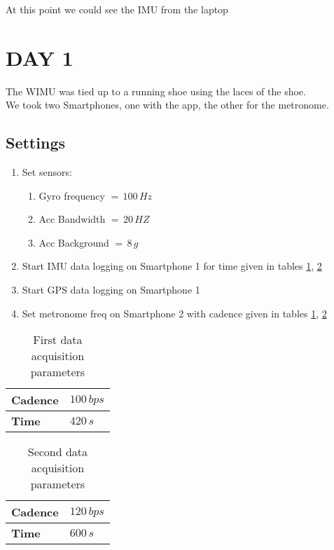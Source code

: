 \documentclass[a4paper,twoside,10pt]{report}
\begin{document}
At this point we could see the IMU from the laptop 
 



\section{DAY 1}
The WIMU was tied up to a running shoe using the laces of the shoe. \\
We took two Smartphones, one with the app, the other for the metronome. \\

\subsection{Settings} 
\begin{enumerate}
	\item Set sensors: 
		\begin{enumerate}
			\item Gyro frequency  $=\, 100\,Hz$
			\item Acc Bandwidth  $=\, 20\, HZ$
			\item Acc Background $=\, 8\,g$
		\end{enumerate}
	\item Start IMU data logging on Smartphone 1 for time given in tables \ref{tab:FirstDataAcquisitionParameters}, \ref{tab:SecondDataAcquisitionParameters}
	\item Start GPS data logging on Smartphone 1
	\item Set metronome freq on Smartphone 2 with cadence given in tables \ref{tab:FirstDataAcquisitionParameters}, \ref{tab:SecondDataAcquisitionParameters}
\end{enumerate}

\begin{table}[h]
	\centering
		\begin{tabular}{|l|l|}
		  \hline
			\textbf{Cadence} & $100\,bps$\\
			\hline
			\textbf{Time} & $420\,s$\\
			\hline
		\end{tabular}
	\caption{First data acquisition parameters}
	\label{tab:FirstDataAcquisitionParameters}
\end{table}

\begin{table}[h]
	\centering
		\begin{tabular}{|l|l|}
		  \hline
			\textbf{Cadence} & $120\,bps$\\
			\hline
			\textbf{Time} & $600\,s$\\
			\hline
		\end{tabular}
	\caption{Second data acquisition parameters}
	\label{tab:SecondDataAcquisitionParameters}
\end{table}
\end{document}
